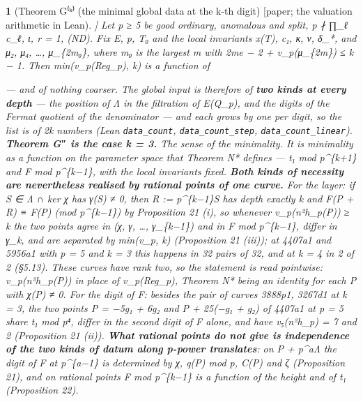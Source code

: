 \documentclass[11pt,a4paper]{article}
\theoremstyle{named}
\newtheorem*{namedthm}{}
\newcommand{\dispf}[1]{\par\smallskip{\centering #1\par}\smallskip}
\begin{document}
\begin{namedthm}[Theorem G⁽ᵏ⁾ (the minimal global data at the k-th digit) [paper; the valuation arithmetic in Lean]]
Let p ≥ 5 be good ordinary, anomalous and split, p ∤ ∏\_ℓ c\_ℓ, ι, r = 1, (ND). Fix E, p, T₀ and the local invariants x(T), c₁, κ, ν, δ\_*, and μ₂, μ₄, …, μ\_\{2m₀\}, where m₀ is the largest m with 2me − 2 + v\_p(μ\_\{2m\}) ≤ k − 1. Then min(v\_p(Reg\_p), k) is a function of
\dispf{\textbf{(χ, γ, γ₂, …, γ\_k)  and  F mod p\textasciicircum{}\{k−1\}}.}
— and of nothing coarser. The global input is therefore of \textbf{two kinds at every depth} — the position of Λ in the filtration of E(Q\_p), and the digits of the Fermat quotient of the denominator — and each grows by one per digit, so the list is of 2k numbers (Lean \texttt{data\_\allowbreak{}count}, \texttt{data\_\allowbreak{}count\_\allowbreak{}step}, \texttt{data\_\allowbreak{}count\_\allowbreak{}linear}). \textbf{Theorem G″ is the case k = 3.}
\textit{The sense of the minimality.} It is minimality as a function on the parameter space that Theorem N* defines — t₁ mod p\textasciicircum{}\{k+1\} and F mod p\textasciicircum{}\{k−1\}, with the local invariants fixed. \textbf{Both kinds of necessity are nevertheless realised by rational points of one curve.} For the layer: if S ∈ Λ ∩ ker χ has γ(S) ≠ 0, then R := p\textasciicircum{}\{k−1\}S has depth exactly k and F(P + R) ≡ F(P) (mod p\textasciicircum{}\{k−1\}) by Proposition 21 (i), so whenever v\_p(n²h\_p(P)) ≥ k the two points agree in (χ, γ, …, γ\_\{k−1\}) and in F mod p\textasciicircum{}\{k−1\}, differ in γ\_k, and are separated by min(v\_p, k) (Proposition 21 (iii)); at 4407a1 and 5956a1 with p = 5 and k = 3 this happens in 32 pairs of 32, and at k = 4 in 2 of 2 (§5.13). These curves have rank two, so the statement is read pointwise: v\_p(n²h\_p(P)) in place of v\_p(Reg\_p), Theorem N* being an identity for each P with χ(P) ≠ 0. For the digit of F: besides the pair of curves 3888p1, 3267d1 at k = 3, the two points P = −5g₁ + 6g₂ and P + 25(−g₁ + g₂) of 4407a1 at p = 5 share t₁ mod p⁴, differ in the second digit of F alone, and have v₅(n²h\_p) = 7 and 2 (Proposition 21 (ii)). \textbf{What rational points do not give is independence of the two kinds of datum along p-power translates}: on P + p\textasciicircum{}aΛ the digit of F at p\textasciicircum{}\{a−1\} is determined by χ, q(P) mod p, C(P) and ζ (Proposition 21), and on rational points F mod p\textasciicircum{}\{k−1\} is a function of the height and of t₁ (Proposition 22).
\end{namedthm}
\end{document}
